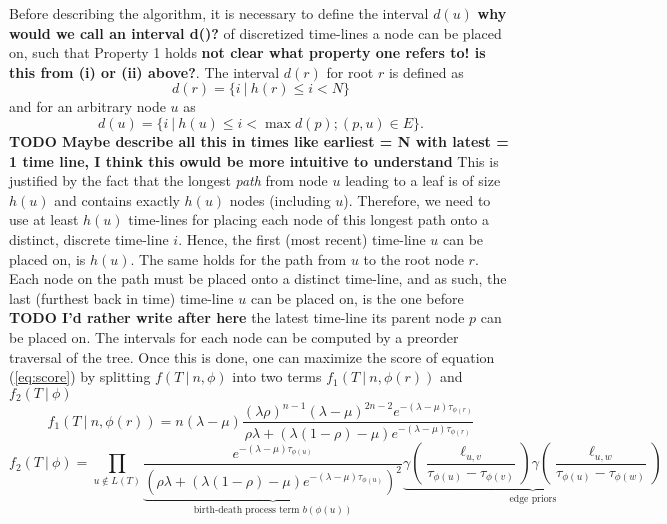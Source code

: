 \documentclass{llncs}
\begin{document}
Before describing the algorithm, it is necessary to define the interval $d(u)$ {\bf why would we call an interval d()?} of
discretized time-lines a node can be placed on, such that Property 1 holds {\bf not clear what property one refers to! is this from (i) or (ii) above?}. The
interval $d(r)$ for root $r$ is defined as 
$$d(r) = \{ i\ |\ h(r) \leq i <N\}$$ and for an arbitrary node $u$ as $$d(u) = \{ i\ |\ h(u) \leq i < \max
d(p); (p,u) \in E\}.$$ 
{\bf TODO Maybe describe all this in times like earliest = N with latest = 1 time line, I think this owuld be more intuitive to understand}
This is justified by the fact that the longest {\em path} from node $u$ leading to a leaf is of size $h(u)$ and contains exactly
$h(u)$ nodes (including $u$).  Therefore, we need to use at least $h(u)$ time-lines
for placing each node of this longest path onto a distinct, discrete time-line $i$.  
Hence, the first (most recent) time-line $u$ can be placed on, is $h(u)$. 
The same holds for the path from
$u$ to the root node $r$.  Each node on the path must be placed onto a distinct
time-line, and as such, the last (furthest back in time) time-line $u$ can be placed on, is the
one before {\bf TODO I'd rather write after here} the latest time-line its parent node $p$ can be placed on. The intervals for each
node can be computed by a preorder traversal of the tree.
Once this is done, one can maximize the score of equation (\ref{eq:score}) by splitting $f(T\ |\ n, \phi)$ into two terms
$f_1(T\ |\ n,\phi(r))$ and $f_2(T\ |\ \phi)$
%
%
\begin{equation}\label{eq:part1} 
f_1(T\ |\ n,\phi(r)) = n (\lambda-\mu)
                       \frac{(\lambda\rho)^{n-1}%
                             (\lambda-\mu)^{2n-2}%
                             e^{-(\lambda-\mu)\tau_{\phi(r)}}}%
                            {\rho\lambda +%
                             (\lambda(1 -\rho)-\mu)%
                             e^{-(\lambda-\mu)\tau_{\phi(r)}}}
\end{equation}
%
%
\begin{equation}\label{eq:part2}
f_2(T\ |\ \phi) = \prod_{u\notin L(T)}
                  \underbrace{
                    \frac{e^{-(\lambda-\mu)\tau_{\phi(u)}}}
                         {(\rho\lambda + 
                          (\lambda(1-\rho)-\mu)
                          e^{-(\lambda-\mu)\tau_{\phi(u)}})^2}
                  }_{\textrm{birth-death process term } b(\phi(u))}
                  \underbrace{
                    \gamma(\frac{\ell_{u,v}}{\tau_{\phi(u)}-\tau_{\phi(v)}})
                    \gamma(\frac{\ell_{u,w}}{\tau_{\phi(u)}-\tau_{\phi(w)}})
                  }_{\textrm{edge priors}}
\end{equation}
\end{document}
